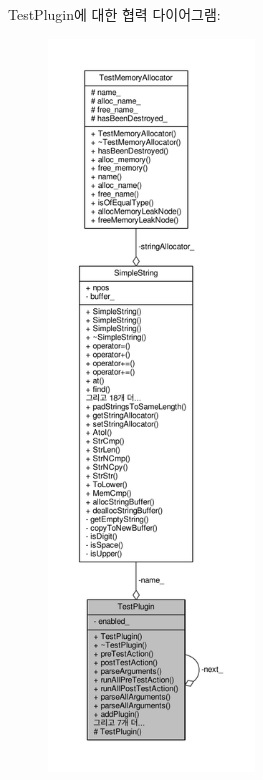 Test\+Plugin에 대한 협력 다이어그램\+:
\nopagebreak
\begin{figure}[H]
\begin{center}
\leavevmode
\includegraphics[height=550pt]{class_test_plugin__coll__graph}
\end{center}
\end{figure}
